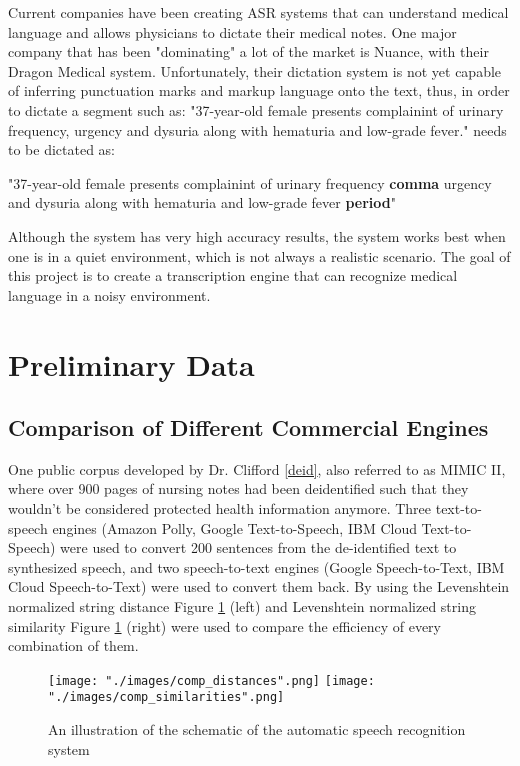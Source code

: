 Current companies have been creating ASR systems that can understand medical language and allows physicians to dictate their medical notes. One major company that has been "dominating" a lot of the market is Nuance, with their Dragon Medical system. Unfortunately, their dictation system is not yet capable of inferring punctuation marks and markup language onto the text, thus, in order to dictate a segment such as: "37-year-old female presents complainint of urinary frequency, urgency and dysuria along with hematuria and low-grade fever." needs to be dictated as:

\begin{center}
    "37-year-old female presents complainint of urinary frequency \textbf{comma} urgency and dysuria along with hematuria and low-grade fever \textbf{period}"
\end{center}

Although the system has very high accuracy results, the system works best when one is in a quiet environment, which is not always a realistic scenario. The goal of this project is to create a transcription engine that can recognize medical language in a noisy environment.

\section{Preliminary Data}

\subsection{Comparison of Different Commercial Engines}
One public corpus developed by Dr. Clifford \ref{deid}, also referred to as MIMIC II, where over 900 pages of nursing notes had been deidentified such that they wouldn't be considered protected health information anymore. Three text-to-speech engines (Amazon Polly, Google Text-to-Speech, IBM Cloud Text-to-Speech) were used to convert 200 sentences from the de-identified text to synthesized speech, and two speech-to-text engines (Google Speech-to-Text, IBM Cloud Speech-to-Text) were used to convert them back. By using the Levenshtein normalized string distance Figure \ref{fig::comparison} (left) and Levenshtein normalized string similarity Figure \ref{fig::comparison} (right) were used to compare the efficiency of every combination of them.
\begin{figure}[H]
\begin{center}
    \texttt{[image: "./images/comp\_distances".png]}
    \texttt{[image: "./images/comp\_similarities".png]}
    \caption{An illustration of the schematic of the automatic speech recognition system}
    \label{fig::comparison}
\end{center}
\end{figure}

